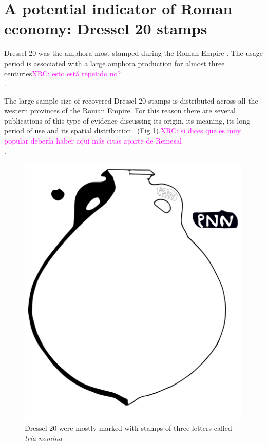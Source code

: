 \documentclass[review]{elsarticle}
\newcommand{\memo}[2]{\textcolor{#1}{#2}}
\newcommand{\xavi}[1]{\memo{magenta}{XRC: #1\\}}
\begin{document}
\section{A potential indicator of Roman economy: Dressel 20 stamps}

Dressel 20 was the amphora most stamped during the Roman Empire \citep[18]{millet_anforas_1998}. The usage period is associated with a large amphora production for almost three centuries\xavi{esto está repetido no?}. 

The large sample size of recovered Dressel 20 stamps is distributed across all the western provinces of the Roman Empire. For this reason there are several publications of this type of evidence discussing its origin, its meaning, its long period of use and its spatial distribution~\citep{remesal_sellar_2016} (Fig.\ref{amphora}).\xavi{si dices que es muy popular debería haber aquí más citas aparte de Remesal}. 

\begin{figure}[htp]
	\centering
\includegraphics[scale=0.5]{figs/dressel20}
\caption{Dressel 20 were mostly marked with stamps of three letters called \textit{tria nomina}}
\label{amphora}
\end{figure} 
\end{document}
